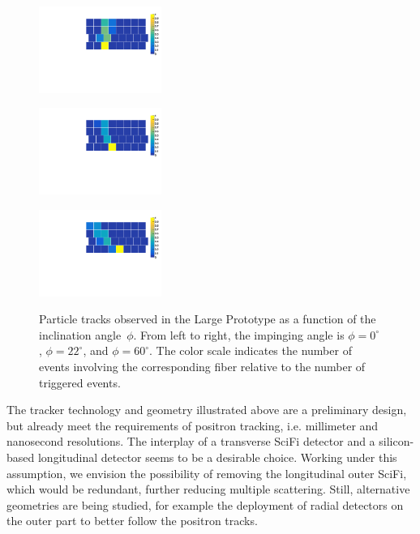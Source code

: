 \begin{refsection}
        \begin{figure}
        	\centering
         \begin{minipage}{.3\textwidth}
          \centering	
        		\includegraphics[width=4cm]{Figures/muEDM/prototype/SquaredFiberIlluminationOffset2275.pdf}
        		\label{Ffig:angletracks:0deg}
         \end{minipage}%
         \begin{minipage}{.3\textwidth}
          \centering		
        		\includegraphics[width=4cm]{Figures/muEDM/prototype/SquaredFiberIlluminationOffset2272.pdf}
        		\label{fig:angletracks:22deg}
        \end{minipage}%
        \begin{minipage}{.3\textwidth}
          \centering
        		\includegraphics[width=4cm]{Figures/muEDM/prototype/SquaredFiberIlluminationOffset2274.pdf}
        		\label{fig:angletracks:60deg}
        \end{minipage}%
        \caption[]{Particle tracks observed in the Large Prototype as a function of the inclination angle~$\phi$. From left to right, the impinging angle is $\phi = 0^{\circ}$, $\phi = 22^{\circ}$, and $\phi = 60^{\circ}$. The color scale indicates the number of events involving the corresponding fiber relative to the number of triggered events.}
        \label{fig:SciFi_position}
        \end{figure}
        
        The tracker technology and geometry illustrated above are a preliminary design, but already meet the requirements of positron tracking, i.e. millimeter and nanosecond resolutions. The interplay of a transverse SciFi detector and a silicon-based longitudinal detector seems to be a desirable choice. Working under this assumption, we envision the possibility of removing the longitudinal outer SciFi, which would be redundant, further reducing multiple scattering. Still, alternative geometries are being studied, for example the deployment of radial detectors on the outer part to better follow the positron tracks. 


\end{refsection}
